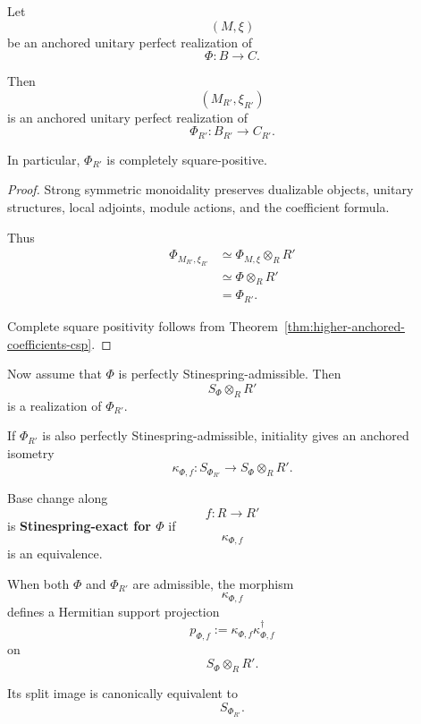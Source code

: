 \begin{proposition}
\label{prop:higher-base-change-realized-coefficients}
Let
\[
  (M,\xi)
\]
be an anchored unitary perfect realization of
\[
  \Phi:B\to C.
\]

Then
\[
  (M_{R'},\xi_{R'})
\]
is an anchored unitary perfect realization of
\[
  \Phi_{R'}:
  B_{R'}\to C_{R'}.
\]

In particular, \(\Phi_{R'}\) is completely square-positive.
\end{proposition}

\begin{proof}
Strong symmetric monoidality preserves dualizable objects, unitary
structures, local adjoints, module actions, and the coefficient formula.

Thus
\[
\begin{aligned}
  \Phi_{M_{R'},\xi_{R'}}
  &\simeq
  \Phi_{M,\xi}\otimes_RR'
  \\
  &\simeq
  \Phi\otimes_RR'
  \\
  &=
  \Phi_{R'}.
\end{aligned}
\]

Complete square positivity follows from
Theorem~\ref{thm:higher-anchored-coefficients-csp}.
\end{proof}

Now assume that \(\Phi\) is perfectly Stinespring-admissible. Then
\[
  S_\Phi\otimes_RR'
\]
is a realization of \(\Phi_{R'}\).

If \(\Phi_{R'}\) is also perfectly Stinespring-admissible, initiality gives an
anchored isometry
\[
  \kappa_{\Phi,f}:
  S_{\Phi_{R'}}
  \longrightarrow
  S_\Phi\otimes_RR'.
\]

\begin{definition}
\label{def:higher-stinespring-exact-base-change}
Base change along
\[
  f:R\to R'
\]
is \textbf{Stinespring-exact for \(\Phi\)} if
\[
  \kappa_{\Phi,f}
\]
is an equivalence.
\end{definition}

\begin{proposition}
\label{prop:higher-base-change-support-projection}
When both \(\Phi\) and \(\Phi_{R'}\) are admissible, the morphism
\[
  \kappa_{\Phi,f}
\]
defines a Hermitian support projection
\[
  p_{\Phi,f}
  :=
  \kappa_{\Phi,f}
  \kappa_{\Phi,f}^\dagger
\]
on
\[
  S_\Phi\otimes_RR'.
\]

Its split image is canonically equivalent to
\[
  S_{\Phi_{R'}}.
\]
\end{proposition}

